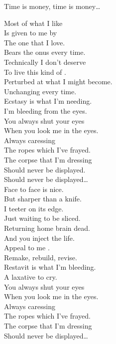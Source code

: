 Time is money, time is money… \\




Most of what I like \\
Is given to me by \\
The one that I love. \\
Bears the onus every time. \\

Technically I don't deserve \\
To live this kind of . \\
Perturbed at what I might become. \\
Unchanging every time. \\

Ecstasy is what I'm needing. \\
I'm bleeding from the eyes. \\
You always shut your eyes \\
When you look me in the eyes. \\

Always caressing \\
The ropes which I've frayed. \\
The corpse that I'm dressing \\
Should never be displayed. \\
Should never be displayed… \\

Face to face is nice. \\
But sharper than a knife. \\
I teeter on its edge. \\
Just waiting to be sliced. \\

Returning home brain dead. \\
And you inject the life. \\
Appeal to me . \\
Remake, rebuild, revise. \\

Restavit is what I'm bleeding. \\
A laxative to cry. \\
You always shut your eyes \\
When you look me in the eyes. \\

Always caressing \\
The ropes which I've frayed. \\
The corpse that I'm dressing \\
Should never be displayed… \\




